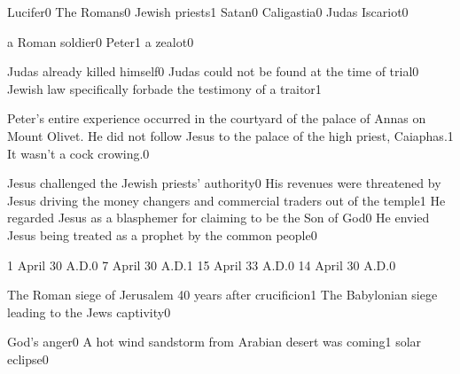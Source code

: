 {Lucifer}{0}
{The Romans}{0}
{Jewish priests}{1}
{Satan}{0}
{Caligastia}{0}
{Judas Iscariot}{0}
\qstop

{a Roman soldier}{0}
{Peter}{1}
{a zealot}{0}
\qstop


{Judas already killed himself}{0}
{Judas could not be found at the time of trial}{0}
{Jewish law specifically forbade the testimony of a traitor}{1}
\qstop

{Peter's entire experience occurred in the courtyard of the palace of Annas on Mount Olivet. He did not follow Jesus to the palace of the high priest, Caiaphas.}{1}
{It wasn't a cock crowing.}{0}
\qstop

{Jesus challenged the Jewish priests' authority}{0}
{His revenues were threatened by Jesus driving the money changers and commercial traders out of the temple}{1}
{He regarded Jesus as a blasphemer for claiming to be the Son of God}{0}
{He envied Jesus being treated as a prophet by the common people}{0}
\qstop


{1 April 30 A.D.}{0}
{7 April 30 A.D.}{1}
{15 April 33 A.D.}{0}
{14 April 30 A.D.}{0}
\qstop



{The Roman siege of Jerusalem 40 years after crucificion}{1}
{The Babylonian siege leading to the Jews captivity}{0}
\qstop

{God's anger}{0}
{A hot wind sandstorm from Arabian desert was coming}{1}
{solar eclipse}{0}
\qstop

